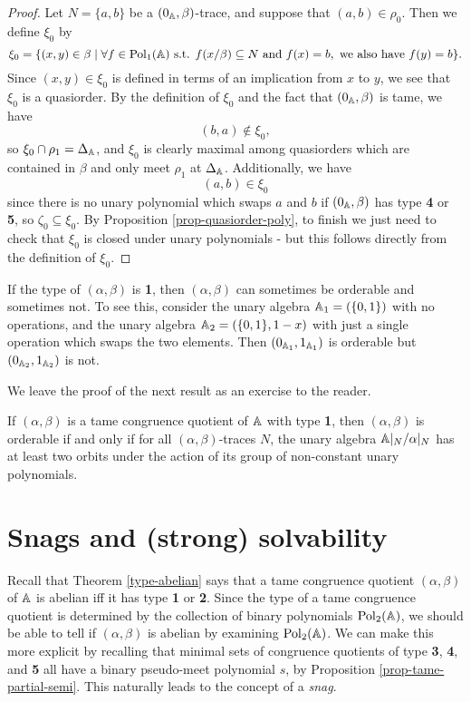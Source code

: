 \begin{appendices}
\begin{proof}
Let $N = \{a,b\}$ be a $(0_{\mathbb{A}},\beta)$-trace, and suppose that $(a,b) \in \rho_0$. Then we define $\xi_0$ by
\[
\xi_0 = \{(x,y) \in \beta \mid \forall f \in \operatorname{Pol}_1(\mathbb{A}) \text{ s.t. } f(x/\beta) \subseteq N \text{ and } f(x) = b, \text{ we also have } f(y) = b\}.
\]
Since $(x,y) \in \xi_0$ is defined in terms of an implication from $x$ to $y$, we see that $\xi_0$ is a quasiorder. By the definition of $\xi_0$ and the fact that $(0_{\mathbb{A}},\beta)$ is tame, we have
\[
(b,a) \not\in \xi_0,
\]
so $\xi_0 \cap \rho_1 = \Delta_{\mathbb{A}}$, and $\xi_0$ is clearly maximal among quasiorders which are contained in $\beta$ and only meet $\rho_1$ at $\Delta_{\mathbb{A}}$. Additionally, we have
\[
(a,b) \in \xi_0
\]
since there is no unary polynomial which swaps $a$ and $b$ if $(0_{\mathbb{A}},\beta)$ has type \textbf{4} or \textbf{5}, so $\zeta_0 \subseteq \xi_0$. By Proposition \ref{prop-quasiorder-poly}, to finish we just need to check that $\xi_0$ is closed under unary polynomials - but this follows directly from the definition of $\xi_0$.
\end{proof}

\begin{ex} If the type of $(\alpha,\beta)$ is \textbf{1}, then $(\alpha,\beta)$ can sometimes be orderable and sometimes not. To see this, consider the unary algebra $\mathbb{A}_1 = (\{0,1\})$ with no operations, and the unary algebra $\mathbb{A}_2 = (\{0,1\}, 1-x)$ with just a single operation which swaps the two elements. Then $(0_{\mathbb{A}_1},1_{\mathbb{A}_1})$ is orderable but $(0_{\mathbb{A}_2}, 1_{\mathbb{A}_2})$ is not.
\end{ex}

We leave the proof of the next result as an exercise to the reader.

\begin{thm} If $(\alpha,\beta)$ is a tame congruence quotient of $\mathbb{A}$ with type \textbf{1}, then $(\alpha,\beta)$ is orderable if and only if for all $(\alpha,\beta)$-traces $N$, the unary algebra $\mathbb{A}|_N/\alpha|_N$ has at least two orbits under the action of its group of non-constant unary polynomials.
\end{thm}


\section{Snags and (strong) solvability}\label{a-sec-snags}

Recall that Theorem \ref{type-abelian} says that a tame congruence quotient $(\alpha,\beta)$ of $\mathbb{A}$ is abelian iff it has type \textbf{1} or \textbf{2}. Since the type of a tame congruence quotient is determined by the collection of binary polynomials $\operatorname{Pol}_2(\mathbb{A})$, we should be able to tell if $(\alpha,\beta)$ is abelian by examining $\operatorname{Pol}_2(\mathbb{A})$. We can make this more explicit by recalling that minimal sets of congruence quotients of type \textbf{3}, \textbf{4}, and \textbf{5} all have a binary pseudo-meet polynomial $s$, by Proposition \ref{prop-tame-partial-semi}. This naturally leads to the concept of a \emph{snag}.


\end{appendices}
